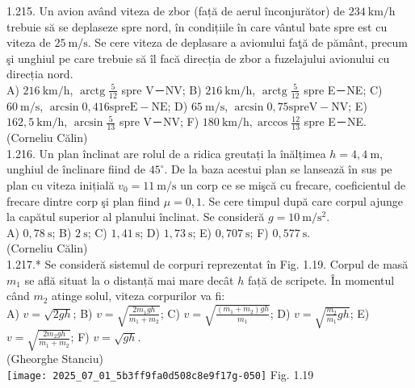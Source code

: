 {1.215. Un avion având viteza de zbor (față de aerul înconjurător) de $234 \mathrm{~km} / \mathrm{h}$ trebuie să se deplaseze spre nord, în condițiile în care vântul bate spre est cu viteza de $25 \mathrm{~m} / \mathrm{s}$. Se cere viteza de deplasare a avionului faţă de pământ, precum şi unghiul pe care trebuie să îl facă direcția de zbor a fuzelajului avionului cu direcția nord.\\ A) $216 \mathrm{~km} / \mathrm{h}$, $\operatorname{arctg} \frac{5}{12}$ spre V－NV; B) $216 \mathrm{~km} / \mathrm{h}$, $\operatorname{arctg} \frac{5}{12}$ spre E－NE; C) $60 \mathrm{~m} / \mathrm{s}$, $\arcsin 0,416 \mathrm{spre} \mathrm{E}-\mathrm{NE}$; D) $65 \mathrm{~m} / \mathrm{s}$, $\arcsin 0,75 \mathrm{spre} \mathrm{V}-\mathrm{NV}$; E) $162,5 \mathrm{~km} / \mathrm{h}$, $\arcsin \frac{5}{13}$ spre V－NV; F) $180 \mathrm{~km} / \mathrm{h}, \arccos \frac{12}{13}$ spre E－NE.\\ (Corneliu Călin)\\

1.216. Un plan înclinat are rolul de a ridica greutați la înălțimea $h=4,4 \mathrm{~m}$, unghiul de înclinare fiind de $45^{\circ}$. De la baza acestui plan se lansează în sus pe plan cu viteza inițială $v_{0}=11 \mathrm{~m} / \mathrm{s}$ un corp ce se mişcă cu frecare, coeficientul de frecare dintre corp şi plan fiind $\mu=0,1$. Se cere timpul după care corpul ajunge la capătul superior al planului înclinat. Se consideră $g=10 \mathrm{~m} / \mathrm{s}^{2}$.\\ A) $0,78 \mathrm{~s}$; B) $2 \mathrm{~s}$; C) $1,41 \mathrm{~s}$; D) $1,73 \mathrm{~s}$; E) $0,707 \mathrm{~s}$; F) $0,577 \mathrm{~s}$.\\ (Corneliu Călin)\\

1.217.* Se consideră sistemul de corpuri reprezentat în Fig. 1.19. Corpul de masă $m_{1}$ se află situat la o distanță mai mare decât $h$ față de scripete. În momentul când $m_{2}$ atinge solul, viteza corpurilor va fi:\\ A) $v=\sqrt{2 g h}$; B) $v=\sqrt{\frac{2 m_{1} g h}{m_{1}+m_{2}}}$; C) $v=\sqrt{\frac{\left(m_{1}+m_{2}\right) g h}{m_{1}}}$; D) $v=\sqrt{\frac{m_{2}}{m_{1}} g h}$; E) $v=\sqrt{\frac{2 m_{2} g h}{m_{1}+m_{2}}}$; F) $v=\sqrt{g h}$.\\ (Gheorghe Stanciu)\\ \texttt{[image: 2025\_07\_01\_5b3ff9fa0d508c8e9f17g-050]} Fig. 1.19\\

}
